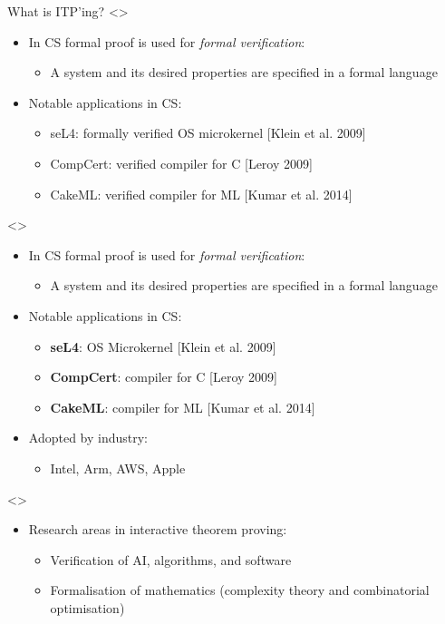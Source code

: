 \documentclass[compress,10pt,xcolor=dvipsnames]{beamer}
\begin{document}
\begin{frame}{What is ITP'ing?}
\note<\formalproofCS>{
\tiny
  \begin{itemize}
  \item In CS formal proof is used for \emph{formal verification}:
    \begin{itemize}
    \item A system and its desired properties are specified in a formal language
    \end{itemize}
  \item Notable applications in CS:
    \begin{itemize}
    \item seL4: formally verified OS microkernel [Klein et al. 2009]
    \item CompCert: verified compiler for C [Leroy 2009]
    \item CakeML: verified compiler for ML [Kumar et al. 2014]
    \end{itemize}
  \end{itemize}
}

\only<\formalproofCS>{
\begin{itemize}
  \item In CS formal proof is used for \emph{formal verification}:
    \begin{itemize}
    \item A system and its desired properties are specified in a formal language
    \end{itemize}
  \item Notable applications in CS:
    \begin{itemize}
    \item \textbf{seL4}: OS Microkernel [Klein et al. 2009]
    \item \textbf{CompCert}: compiler for C [Leroy 2009]
    \item \textbf{CakeML}: compiler for ML [Kumar et al. 2014]
    \end{itemize}
  \item Adopted by industry:
    \begin{itemize}
    \item Intel, Arm, AWS, Apple
    \end{itemize} 
  \end{itemize}  
}

\note<\formalproofmywork>{
\tiny
\begin{itemize}
  \item Research areas in interactive theorem proving:
  \begin{itemize}
    \item Verification of AI, algorithms, and software
    \item Formalisation of mathematics (complexity theory and combinatorial optimisation)
  \end{itemize}
\end{itemize}
}


\end{frame}
\end{document}
